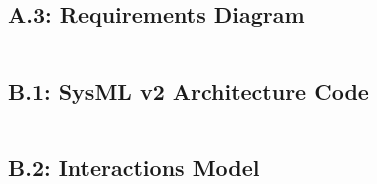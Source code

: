 \subsection*{A.3: Requirements Diagram}
\inputminted{text}{ressources/models/requirements.sysml}

\subsection*{B.1: SysML v2 Architecture Code}
\inputminted{text}{ressources/models/architecture.sysml}

\subsection*{B.2: Interactions Model}
\inputminted{text}{ressources/models/interactions.sysml}




